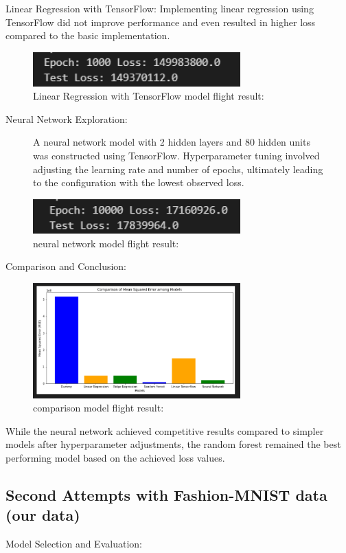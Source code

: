 \documentclass{article}
\begin{document}
Linear Regression with TensorFlow: Implementing linear regression using TensorFlow did not improve performance and even resulted in higher loss compared to the basic implementation.
\begin{figure}[H]
    \caption{Linear Regression with TensorFlow model flight result:}
    \centering
    \includegraphics[width=8cm]{imgFolder/linearRegressionTensorflowFlight.png}
\end{figure}

Neural Network Exploration:

\begin{figure}[H]
    A neural network model with 2 hidden layers and 80 hidden units was constructed using TensorFlow. Hyperparameter tuning involved adjusting the learning rate and number of epochs, ultimately leading to the configuration with the lowest observed loss.
    \caption{neural network model flight result:}
    \centering
    \includegraphics[width=8cm]{imgFolder/neuronNetworkFlight.png}
\end{figure}

Comparison and Conclusion:
\begin{figure}[H]
    \caption{comparison model flight result:}
    \centering
    \includegraphics[width=8cm]{imgFolder/comparisonFlight.png}
\end{figure}
While the neural network achieved competitive results compared to simpler models after hyperparameter adjustments, the random forest remained the best performing model based on the achieved loss values.

\subsection{Second Attempts with Fashion-MNIST data (our data)}
Model Selection and Evaluation:
\end{document}
